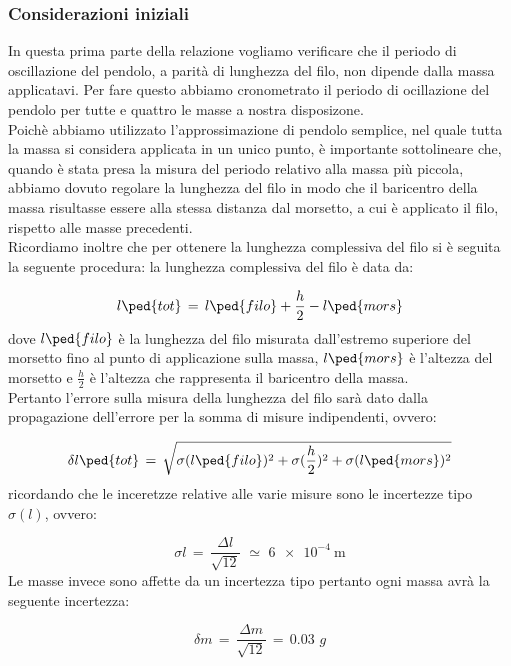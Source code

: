 \subsubsection{Considerazioni iniziali}
In questa prima parte della relazione vogliamo verificare che il periodo di oscillazione del pendolo, a parità di lunghezza del filo, non dipende dalla massa applicatavi.
Per fare questo abbiamo cronometrato il periodo di ocillazione del pendolo per tutte e quattro le masse a nostra disposizone.\\
Poichè abbiamo utilizzato l'approssimazione di pendolo semplice, nel quale tutta la massa si considera applicata in un unico punto, è importante sottolineare che, quando è stata presa la misura del periodo relativo alla massa più piccola, abbiamo dovuto regolare la lunghezza del filo in modo che il baricentro della massa risultasse essere alla stessa distanza dal morsetto, a cui è applicato il filo, rispetto alle masse precedenti.\\
Ricordiamo inoltre che per ottenere la lunghezza complessiva del filo si è seguita la seguente procedura: la lunghezza complessiva del filo è data da:

\begin{equation}
	l\ped{tot} \,=\, l\ped{filo} + \frac{h}{2} - l\ped{mors}
\end{equation}
%
dove $l\ped{filo}$ è la lunghezza del filo misurata dall'estremo superiore del morsetto fino al punto di applicazione sulla massa, $l\ped{mors}$ è l'altezza del morsetto e $\frac{h}{2}$ è l'altezza che rappresenta il baricentro della massa.\\
Pertanto l'errore sulla misura della lunghezza del filo sarà dato dalla propagazione dell'errore per la somma di misure indipendenti, ovvero:

\begin{equation*}
	\delta l\ped{tot} \,=\, \sqrt{\sigma (l\ped{filo})^2 + \sigma (\frac{h}{2})^2 + \sigma (l\ped{mors})^2}
\end{equation*}
%
ricordando che le inceretzze relative alle varie misure sono le incertezze tipo $\sigma (l)$, ovvero:

\begin{equation*}
	\sigma l \,=\, \frac{\Delta l}{\sqrt{12}} \,\, \simeq \,\, \SI{6e-4}{\meter}
\end{equation*}
%
Le masse invece sono affette da un incertezza tipo pertanto ogni massa avrà la seguente incertezza:

\begin{equation*}
	\delta m \,=\, \frac{\Delta m}{\sqrt{12}} \,=\, 0.03 \,\, g
\end{equation*}

